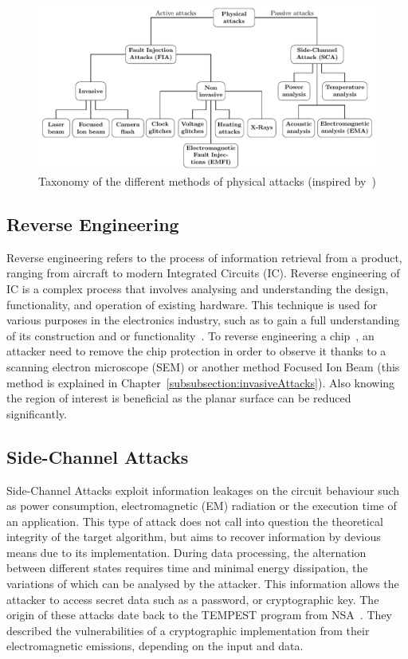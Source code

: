 \begin{figure}[ht]
    \centering
    \includegraphics[width=\textwidth, page=1]{c2_soa/img/physicalAttacks.pdf}
    \caption{Taxonomy of the different methods of physical attacks (inspired by~\cite{CKNDCTD-21-compsec})}
    \label{fig:arbo_fia}
\end{figure}

\subsection{Reverse Engineering}
Reverse engineering refers to the process of information retrieval from a product, ranging from aircraft to modern Integrated Circuits (IC). Reverse engineering of IC is a complex process that involves analysing and understanding the design, functionality, and operation of existing hardware. This technique is used for various purposes in the electronics industry, such as to gain a full understanding of its construction and or functionality~\cite{QCFASWCT-16-emergTech}.
To reverse engineering a chip~\cite{FSKWERP-17-ivsw}, an attacker need to remove the chip protection in order to observe it thanks to a scanning electron microscope (SEM) or another method Focused Ion Beam (this method is explained in Chapter~\ref{subsubsection:invasiveAttacks}). Also knowing the region of interest is beneficial as the planar surface can be reduced significantly.

\subsection{Side-Channel Attacks}
Side-Channel Attacks exploit information leakages on the circuit behaviour such as power consumption, electromagnetic (EM) radiation or the execution time of an application.
This type of attack does not call into question the theoretical integrity of the target algorithm, but aims to recover information by devious means due to its implementation. During data processing, the alternation between different states requires time and minimal energy dissipation, the variations of which can be analysed by the attacker.
This information allows the attacker to access secret data such as a password, or cryptographic key. The origin of these attacks date back to the \mbox{TEMPEST} program from NSA~\cite{F-72-nsa}. They described the vulnerabilities of a cryptographic implementation from their electromagnetic emissions, depending on the input and data.

